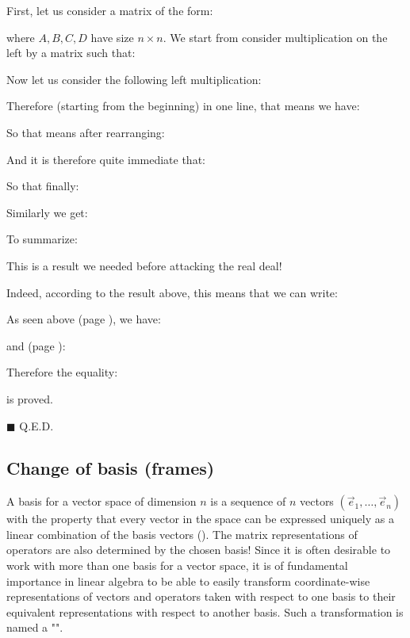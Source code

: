 	\begin{dem}
	First, let us consider a matrix of the form:
	
	where $A,B,C,D$ have size $n\times n$. We start from consider multiplication on the left by a matrix such that:
	
	Now let us consider the following left multiplication:
	
	Therefore (starting from the beginning) in one line, that means we have:
	
	So that means after rearranging:
	
	And it is therefore quite immediate that:
	
	So that finally:
	 
	Similarly we get:
	
	To summarize:
	
	This is a result we needed before attacking the real deal!
	
	Indeed, according to the result above, this means that we can write:
	
	
	As seen above (page \pageref{determinant product}), we have:
	
	and (page \pageref{determinant of block-diagonal or block-triangular matrices}):
	
	Therefore the equality:
	
	is proved.
	\begin{flushright}
		$\blacksquare$  Q.E.D.
	\end{flushright}
	\end{dem}
	
	\pagebreak
	\subsection{Change of basis (frames)}\label{change of basis}
	A basis for a vector space of dimension $n$ is a sequence of $n$ vectors $(\vec{e}_1, …, \vec{e}_n)$ with the property that every vector in the space can be expressed uniquely as a linear combination of the basis vectors (). The matrix representations of operators are also determined by the chosen basis! Since it is often desirable to work with more than one basis for a vector space, it is of fundamental importance in linear algebra to be able to easily transform coordinate-wise representations of vectors and operators taken with respect to one basis to their equivalent representations with respect to another basis. Such a transformation is named a "".
	

